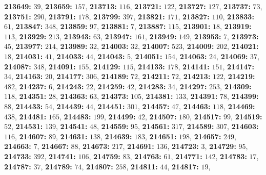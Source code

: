 \textsf{\bfseries 213649:} $39$, \textsf{\bfseries 213659:} $157$, \textsf{\bfseries 213713:} $116$, \textsf{\bfseries 213721:} $122$, \textsf{\bfseries 213727:} $127$, \textsf{\bfseries 213737:} $73$, \textsf{\bfseries 213751:} $290$, \textsf{\bfseries 213791:} $178$, \textsf{\bfseries 213799:} $397$, \textsf{\bfseries 213821:} $171$, \textsf{\bfseries 213827:} $110$, \textsf{\bfseries 213833:} $61$, \textsf{\bfseries 213847:} $348$, \textsf{\bfseries 213859:} $97$, \textsf{\bfseries 213881:} $7$, \textsf{\bfseries 213887:} $115$, \textsf{\bfseries 213901:} $18$, \textsf{\bfseries 213919:} $113$, \textsf{\bfseries 213929:} $213$, \textsf{\bfseries 213943:} $63$, \textsf{\bfseries 213947:} $161$, \textsf{\bfseries 213949:} $149$, \textsf{\bfseries 213953:} $7$, \textsf{\bfseries 213973:} $45$, \textsf{\bfseries 213977:} $214$, \textsf{\bfseries 213989:} $32$, \textsf{\bfseries 214003:} $32$, \textsf{\bfseries 214007:} $523$, \textsf{\bfseries 214009:} $202$, \textsf{\bfseries 214021:} $18$, \textsf{\bfseries 214031:} $41$, \textsf{\bfseries 214033:} $44$, \textsf{\bfseries 214043:} $5$, \textsf{\bfseries 214051:} $154$, \textsf{\bfseries 214063:} $24$, \textsf{\bfseries 214069:} $37$, \textsf{\bfseries 214087:} $348$, \textsf{\bfseries 214091:} $155$, \textsf{\bfseries 214129:} $115$, \textsf{\bfseries 214133:} $178$, \textsf{\bfseries 214141:} $151$, \textsf{\bfseries 214147:} $34$, \textsf{\bfseries 214163:} $20$, \textsf{\bfseries 214177:} $306$, \textsf{\bfseries 214189:} $72$, \textsf{\bfseries 214211:} $72$, \textsf{\bfseries 214213:} $122$, \textsf{\bfseries 214219:} $482$, \textsf{\bfseries 214237:} $6$, \textsf{\bfseries 214243:} $22$, \textsf{\bfseries 214259:} $42$, \textsf{\bfseries 214283:} $34$, \textsf{\bfseries 214297:} $253$, \textsf{\bfseries 214309:} $118$, \textsf{\bfseries 214351:} $28$, \textsf{\bfseries 214363:} $63$, \textsf{\bfseries 214373:} $105$, \textsf{\bfseries 214381:} $133$, \textsf{\bfseries 214391:} $78$, \textsf{\bfseries 214399:} $88$, \textsf{\bfseries 214433:} $54$, \textsf{\bfseries 214439:} $44$, \textsf{\bfseries 214451:} $301$, \textsf{\bfseries 214457:} $47$, \textsf{\bfseries 214463:} $118$, \textsf{\bfseries 214469:} $438$, \textsf{\bfseries 214481:} $165$, \textsf{\bfseries 214483:} $199$, \textsf{\bfseries 214499:} $42$, \textsf{\bfseries 214507:} $180$, \textsf{\bfseries 214517:} $99$, \textsf{\bfseries 214519:} $52$, \textsf{\bfseries 214531:} $139$, \textsf{\bfseries 214541:} $48$, \textsf{\bfseries 214559:} $95$, \textsf{\bfseries 214561:} $317$, \textsf{\bfseries 214589:} $307$, \textsf{\bfseries 214603:} $116$, \textsf{\bfseries 214607:} $89$, \textsf{\bfseries 214631:} $138$, \textsf{\bfseries 214639:} $183$, \textsf{\bfseries 214651:} $198$, \textsf{\bfseries 214657:} $249$, \textsf{\bfseries 214663:} $7$, \textsf{\bfseries 214667:} $88$, \textsf{\bfseries 214673:} $217$, \textsf{\bfseries 214691:} $136$, \textsf{\bfseries 214723:} $3$, \textsf{\bfseries 214729:} $95$, \textsf{\bfseries 214733:} $392$, \textsf{\bfseries 214741:} $106$, \textsf{\bfseries 214759:} $83$, \textsf{\bfseries 214763:} $61$, \textsf{\bfseries 214771:} $142$, \textsf{\bfseries 214783:} $17$, \textsf{\bfseries 214787:} $37$, \textsf{\bfseries 214789:} $74$, \textsf{\bfseries 214807:} $258$, \textsf{\bfseries 214811:} $44$, \textsf{\bfseries 214817:} $19$, 
